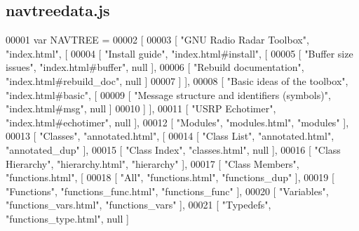 \subsection{navtreedata.\+js}
\label{navtreedata_8js_source}

\begin{DoxyCode}
00001 var NAVTREE =
00002 [
00003   [ \textcolor{stringliteral}{"GNU Radio Radar Toolbox"}, \textcolor{stringliteral}{"index.html"}, [
00004     [ \textcolor{stringliteral}{"Install guide"}, \textcolor{stringliteral}{"index.html#install"}, [
00005       [ \textcolor{stringliteral}{"Buffer size issues"}, \textcolor{stringliteral}{"index.html#buffer"}, null ],
00006       [ \textcolor{stringliteral}{"Rebuild documentation"}, \textcolor{stringliteral}{"index.html#rebuild\_doc"}, null ]
00007     ] ],
00008     [ \textcolor{stringliteral}{"Basic ideas of the toolbox"}, \textcolor{stringliteral}{"index.html#basic"}, [
00009       [ \textcolor{stringliteral}{"Message structure and identifiers (symbols)"}, \textcolor{stringliteral}{"index.html#msg"}, null ]
00010     ] ],
00011     [ \textcolor{stringliteral}{"USRP Echotimer"}, \textcolor{stringliteral}{"index.html#echotimer"}, null ],
00012     [ \textcolor{stringliteral}{"Modules"}, \textcolor{stringliteral}{"modules.html"}, \textcolor{stringliteral}{"modules"} ],
00013     [ \textcolor{stringliteral}{"Classes"}, \textcolor{stringliteral}{"annotated.html"}, [
00014       [ \textcolor{stringliteral}{"Class List"}, \textcolor{stringliteral}{"annotated.html"}, \textcolor{stringliteral}{"annotated\_dup"} ],
00015       [ \textcolor{stringliteral}{"Class Index"}, \textcolor{stringliteral}{"classes.html"}, null ],
00016       [ \textcolor{stringliteral}{"Class Hierarchy"}, \textcolor{stringliteral}{"hierarchy.html"}, \textcolor{stringliteral}{"hierarchy"} ],
00017       [ \textcolor{stringliteral}{"Class Members"}, \textcolor{stringliteral}{"functions.html"}, [
00018         [ \textcolor{stringliteral}{"All"}, \textcolor{stringliteral}{"functions.html"}, \textcolor{stringliteral}{"functions\_dup"} ],
00019         [ \textcolor{stringliteral}{"Functions"}, \textcolor{stringliteral}{"functions\_func.html"}, \textcolor{stringliteral}{"functions\_func"} ],
00020         [ \textcolor{stringliteral}{"Variables"}, \textcolor{stringliteral}{"functions\_vars.html"}, \textcolor{stringliteral}{"functions\_vars"} ],
00021         [ \textcolor{stringliteral}{"Typedefs"}, \textcolor{stringliteral}{"functions\_type.html"}, null ]

\end{DoxyCode}
